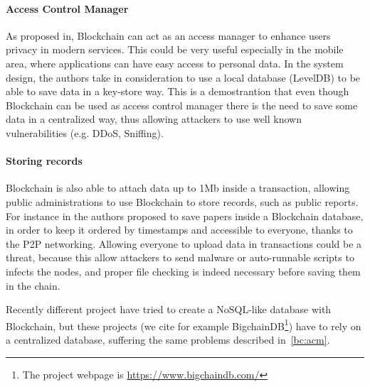 \paragraph*{Access Control Manager}
\label{bc:acm}

As proposed in\cite{dp15}, Blockchain can act as an access manager to enhance
users privacy in modern services. This could be very useful especially in the
mobile area, where applications can have easy access to personal data. In the
system design, the authors take in consideration to use a local database
(LevelDB) to be able to save data in a key-store way. This is a demostrantion
that even though Blockchain can be used as access control manager there is the
need to save some data in a centralized way, thus allowing attackers to use
well known vulnerabilities (e.g. DDoS, Sniffing).

\paragraph*{Storing records}

Blockchain is also able to attach data up to 1Mb \cite{ectel16} inside a
transaction, allowing public administrations to use Blockchain to store
records, such as public reports. For instance in \cite{ectel16} the authors
proposed to save papers inside a Blockchain database, in order to keep it
ordered by timestamps and accessible to everyone, thanks to the P2P networking.
Allowing everyone to upload data in transactions could be a threat, because this
allow attackers to send malware or auto-runnable scripts to infects the nodes,
and proper file checking is indeed necessary before saving them in the chain.


Recently different project have tried to create a NoSQL-like database with
Blockchain, but these projects (we cite for example BigchainDB\footnote{The
project webpage is \url{https://www.bigchaindb.com/}}) have to rely on a
centralized database, suffering the same problems described in~\ref{bc:acm}.
